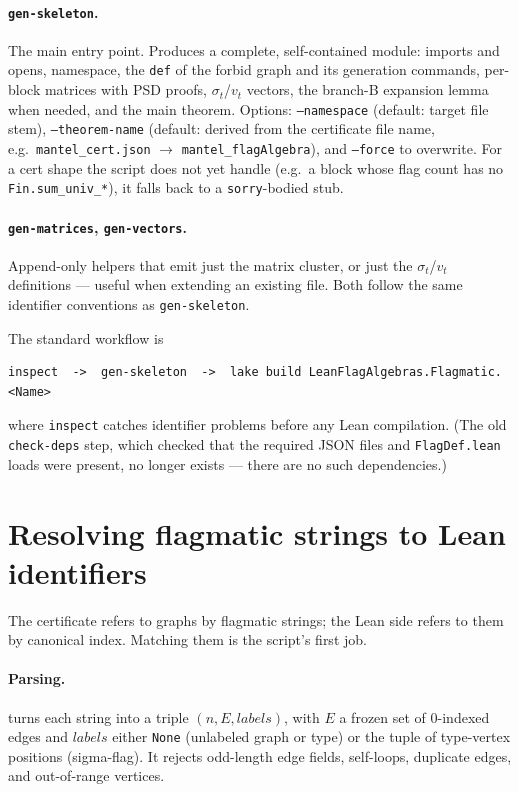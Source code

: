 \documentclass[11pt]{article}
\newcommand{\btt}[1]{\texttt{\detokenize{#1}}}
\begin{document}
\paragraph{\texttt{gen-skeleton}.} The main entry point. Produces a complete,
self-contained module: imports and opens, namespace, the \texttt{def} of the
forbid graph and its generation commands, per-block matrices with PSD proofs,
$\sigma_t$/$v_t$ vectors, the branch-B expansion lemma when needed, and the main
theorem. Options: \texttt{--namespace} (default: target file stem),
\texttt{--theorem-name} (default: derived from the certificate file name, e.g.\
\texttt{mantel\_cert.json} $\to$ \texttt{mantel\_flagAlgebra}), and
\texttt{--force} to overwrite. For a cert shape the script does not yet handle
(e.g.\ a block whose flag count has no \texttt{Fin.sum\_univ\_*}), it falls back
to a \texttt{sorry}-bodied stub.

\paragraph{\texttt{gen-matrices}, \texttt{gen-vectors}.} Append-only helpers that
emit just the matrix cluster, or just the $\sigma_t$/$v_t$ definitions --- useful
when extending an existing file. Both follow the same identifier conventions as
\texttt{gen-skeleton}.

The standard workflow is
\begin{lstlisting}[language={}]
inspect  ->  gen-skeleton  ->  lake build LeanFlagAlgebras.Flagmatic.<Name>
\end{lstlisting}
where \texttt{inspect} catches identifier problems before any Lean compilation.
(The old \texttt{check-deps} step, which checked that the required JSON files and
\texttt{FlagDef.lean} loads were present, no longer exists --- there are no such
dependencies.)

\section{Resolving flagmatic strings to Lean identifiers}
\label{sec:mapping}

The certificate refers to graphs by flagmatic strings; the Lean side refers to
them by canonical index. Matching them is the script's first job.

\paragraph{Parsing.}
\btt{parse_flagmatic} turns each string into a triple $(n, E, \mathit{labels})$,
with $E$ a frozen set of $0$-indexed edges and $\mathit{labels}$ either
\texttt{None} (unlabeled graph or type) or the tuple of type-vertex positions
(sigma-flag). It rejects odd-length edge fields, self-loops, duplicate edges, and
out-of-range vertices.
\end{document}
